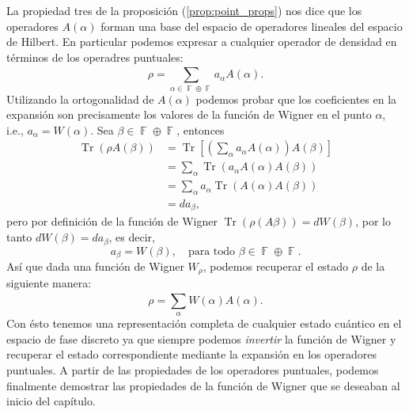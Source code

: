 \documentclass[a4paper,11pt]{report}
\DeclareMathOperator{\F}{\mathbb{F}}
\DeclareMathOperator{\Tr}{Tr}
\begin{document}
  La propiedad tres de la proposición
  (\ref{prop:point_props}) nos dice que los operadores
  $A(\alpha)$ forman una base del espacio de operadores
  lineales del espacio de Hilbert. En particular podemos
  expresar a cualquier operador de densidad en términos de
  los operadres puntuales:
  \begin{equation}
    \rho = \sum_{\alpha \in \F \oplus \F}^{}
    a_\alpha A(\alpha).
  \end{equation} 
  Utilizando la ortogonalidad de $A(\alpha)$ podemos probar
  que los coeficientes en la expansión son precisamente los
  valores de la función de Wigner en el punto $\alpha$,
  i.e., $a_\alpha = W(\alpha)$. Sea $\beta \in \F \oplus
  \F$, entonces
  \begin{align}
    \Tr(\rho A(\beta))
    &= \Tr\left[
      \left(\sum_{\alpha}^{} a_\alpha A(\alpha)\right)
      A(\beta)
    \right] \\
    &= \sum_{\alpha}^{} \Tr\left(
      a_\alpha A(\alpha) A(\beta)
    \right) \\
    &= \sum_{\alpha}^{} a_\alpha \Tr(A(\alpha)A(\beta)) \\
    &= d a_\beta,
  \end{align}
  pero por definición de la función de Wigner
  $\Tr(\rho(A\beta)) = d W(\beta)$, por lo tanto $dW(\beta)
  = d a_\beta$, es decir,
  \begin{equation}
    a_\beta = W(\beta),
    \quad
    \text{para todo } \beta \in \F \oplus \F.
  \end{equation}
  Así que dada una función de Wigner $W_\rho$, podemos
  recuperar el estado $\rho$ de la siguiente manera:
  \begin{equation}
    \rho = \sum_{\alpha}^{} W(\alpha) A(\alpha).
  \end{equation} 
  Con ésto tenemos una representación completa de cualquier
  estado cuántico en el espacio de fase discreto ya que
  siempre podemos \textit{invertir} la función de Wigner y
  recuperar el estado correspondiente mediante la expansión
  en los operadores puntuales. A partir de las propiedades
  de los operadores puntuales, podemos finalmente demostrar
  las propiedades de la función de Wigner que se deseaban al
  inicio del capítulo.
\end{document}
